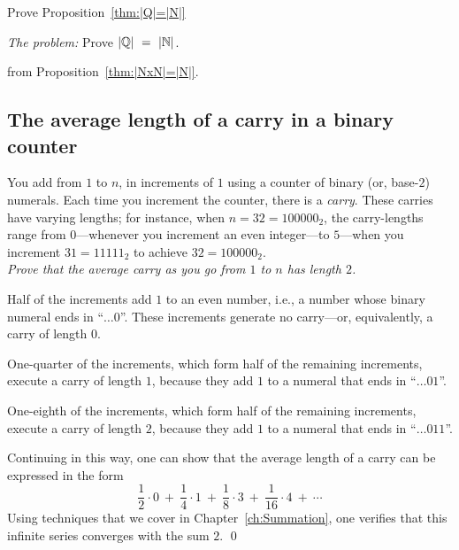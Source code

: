 Prove Proposition~\ref{thm:|Q|=|N|}

\noindent \textit{The problem:}
Prove $|\Q| \ = \ |\N|$.
\medskip

from Proposition~\ref{thm:|NxN|=|N|}.


\subsection{The average length of a carry in a binary counter}

\medskip

%
You add from $1$ to $n$, in increments of $1$ using a counter of
binary (or, base-$2$) numerals.  Each time you increment the counter,
there is a {\it carry}.  These carries have varying lengths; for
instance, when $n = 32 = 100000_2$, the carry-lengths range
from $0$---whenever you increment an even integer---to $5$---when you
increment $31 = 11111_2$ to achieve $32 = 100000_2$. \\
{\em Prove that the average carry as you go from $1$ to $n$ has length $2$.}
\medskip


\noindent
Half of the increments add $1$ to an even number, i.e., a number whose
binary numeral ends in ``$ \ldots 0$''.  These increments generate no
carry---or, equivalently, a carry of length $0$.

\noindent
One-quarter of the increments, which form half of the remaining
increments, execute a carry of length $1$, because they add $1$ to a
numeral that ends in ``$ \ldots 01$''.

\noindent
One-eighth of the increments, which form half of the remaining
increments, execute a carry of length $2$, because they add $1$ to a
numeral that ends in ``$ \ldots 011$''.

Continuing in this way, one can show that the average length of a
carry can be expressed in the form
\[ 
\frac{1}{2} \cdot 0 \ + \ \frac{1}{4} \cdot 1 \ + \ \frac{1}{8} \cdot
3 \ + \ \frac{1}{16} \cdot 4 \ + \ \cdots
\]
Using techniques that we cover in Chapter~\ref{ch:Summation}, one
verifies that this infinite series converges with the sum $2$.  \qed


